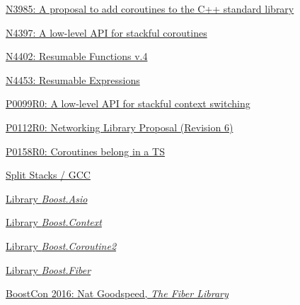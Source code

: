 \begin{thebibliography}{99}

        \href{http://www.open-std.org/jtc1/sc22/wg21/docs/papers/2014/n3985.pdf}
        {N3985: A proposal to add coroutines to the C++ standard library}

        \href{http://www.open-std.org/jtc1/sc22/wg21/docs/papers/2015/n4397.pdf}
        {N4397: A low-level API for stackful coroutines}

        \href{https://isocpp.org/files/papers/N4402.pdf}
        {N4402: Resumable Functions v.4}

        \href{http://www.open-std.org/jtc1/sc22/wg21/docs/papers/2015/n4453.pdf}
        {N4453: Resumable Expressions}

        \href{http://www.open-std.org/jtc1/sc22/wg21/docs/papers/2015/p0099r0.pdf}
        {P0099R0: A low-level API for stackful context switching}

        \href{http://www.open-std.org/jtc1/sc22/wg21/docs/papers/2015/p0112r0.html}
        {P0112R0: Networking Library Proposal (Revision 6)}

        \href{http://www.open-std.org/jtc1/sc22/wg21/docs/papers/2015/p0158r0.html}
        {P0158R0: Coroutines belong in a TS}

        \href{http://gcc.gnu.org/wiki/SplitStacks}
        {Split Stacks / GCC}

        \href{http://www.boost.org/doc/libs/release/doc/html/boost\_asio.html}
        {Library \emph{Boost.Asio}}

        \href{http://www.boost.org/doc/libs/release/libs/context/doc/html/index.html}
        {Library \emph{Boost.Context}}

        \href{http://www.boost.org/doc/libs/release/libs/coroutine2/doc/html/index.html}
        {Library \emph{Boost.Coroutine2}}

        \href{http://olk.github.io/libs/fiber/doc/html/index.html}
        {Library \emph{Boost.Fiber}}

        \href{https://www.youtube.com/watch?v=gcNphOWuUb0}
        {BoostCon 2016: Nat Goodspeed, \emph{The Fiber Library}}

\end{thebibliography}

